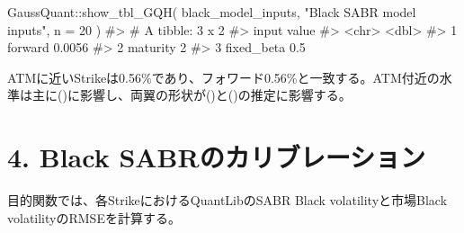 \documentclass[
  letterpaper,
  DIV=11,
  numbers=noendperiod]{scrreprt}
\newenvironment{Shaded}{\begin{snugshade}}{\end{snugshade}}
\newcommand{\AttributeTok}[1]{\textcolor[rgb]{0.40,0.45,0.13}{#1}}
\newcommand{\CommentTok}[1]{\textcolor[rgb]{0.37,0.37,0.37}{#1}}
\newcommand{\DecValTok}[1]{\textcolor[rgb]{0.68,0.00,0.00}{#1}}
\newcommand{\FunctionTok}[1]{\textcolor[rgb]{0.28,0.35,0.67}{#1}}
\newcommand{\NormalTok}[1]{\textcolor[rgb]{0.00,0.23,0.31}{#1}}
\newcommand{\SpecialCharTok}[1]{\textcolor[rgb]{0.37,0.37,0.37}{#1}}
\newcommand{\StringTok}[1]{\textcolor[rgb]{0.13,0.47,0.30}{#1}}
\begin{document}
\begin{Shaded}
\begin{Highlighting}[]
\NormalTok{GaussQuant}\SpecialCharTok{::}\FunctionTok{show\_tbl\_GQH}\NormalTok{(}
\NormalTok{  black\_model\_inputs,}
  \StringTok{"Black SABR model inputs"}\NormalTok{,}
  \AttributeTok{n =} \DecValTok{20}
\NormalTok{)}
\CommentTok{\#\textgreater{} \# A tibble: 3 x 2}
\CommentTok{\#\textgreater{}   input       value}
\CommentTok{\#\textgreater{}   \textless{}chr\textgreater{}       \textless{}dbl\textgreater{}}
\CommentTok{\#\textgreater{} 1 forward    0.0056}
\CommentTok{\#\textgreater{} 2 maturity   2     }
\CommentTok{\#\textgreater{} 3 fixed\_beta 0.5}
\end{Highlighting}
\end{Shaded}

ATMに近いStrikeは0.56\%であり、フォワード0.56\%と一致する。ATM付近の水準は主に(\alpha)に影響し、両翼の形状が(\nu)と(\rho)の推定に影響する。

\section{4. Black
SABRのカリブレーション}\label{black-sabrux306eux30abux30eaux30d6ux30ecux30fcux30b7ux30e7ux30f3}

目的関数では、各StrikeにおけるQuantLibのSABR Black volatilityと市場Black
volatilityのRMSEを計算する。
\end{document}
